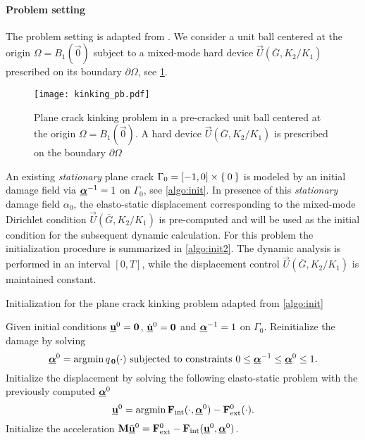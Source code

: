 \paragraph{Problem setting} The problem setting is adapted from \cite{HakimKarma:2005,HakimKarma:2009}. We consider a unit ball centered at the origin $\Omega=B_1(\vec{0})$ subject to a mixed-mode hard device $\vec{U}(\overline{G},K_2/K_1)$ prescribed on its boundary $\partial\Omega$, see \cref{fig:kinking}.
\begin{figure}[htbp]
\centering
\texttt{[image: kinking\_pb.pdf]}
\caption{Plane crack kinking problem in a pre-cracked unit ball centered at the origin $\Omega=B_1(\vec{0})$. A hard device $\vec{U}(\overline{G},K_2/K_1)$ is prescribed on the boundary $\partial\Omega$} \label{fig:kinking}
\end{figure}
An existing \emph{stationary} plane crack $\Gamma_0=[-1,0]\times\Set{0}$ is modeled by an initial damage field via $\dvec^{-1}=1$ on $\Gamma_0$, see \cref{algo:init}. In presence of this \emph{stationary} damage field $\alpha_0$, the elasto-static displacement corresponding to the mixed-mode Dirichlet condition $\vec{U}(\overline{G},K_2/K_1)$ is pre-computed and will be used as the initial condition for the subsequent dynamic calculation. For this problem the initialization procedure is summarized in \cref{algo:init2}. The dynamic analysis is performed in an interval $[0,T]$, while the displacement control $\vec{U}(\overline{G},K_2/K_1)$ is maintained constant.
\begin{algorithm}[htbp]
\caption{Initialization for the plane crack kinking problem adapted from \cref{algo:init}} \label{algo:init2}
\begin{algorithmic}[1]\linespread{1.2}\selectfont\normalsize
\State Given initial conditions $\uvec^0=\vec{0}$, $\dot{\uvec}^0=\vec{0}$ and $\dvec^{-1}=1$ on $\Gamma_0$.
\State Reinitialize the damage by solving
\[
\dvec^0=\operatorname{arg min}q_{\,\vec{0}}(\cdot)\text{ subjected to constraints $0\leq\dvec^{-1}\leq\dvec^0\leq 1$}.
\]
\State Initialize the displacement by solving the following elasto-static problem with the previously computed $\dvec^0$
\[
\uvec^0=\operatorname{arg min}\vec{F}_\mathrm{int}(\cdot,\dvec^0)-\vec{F}_\mathrm{ext}^0(\cdot).
\]
\State Initialize the acceleration $\vec{M}\ddot{\uvec}^0=\vec{F}_\mathrm{ext}^0-\vec{F}_\mathrm{int}(\uvec^0,\dvec^0)$.
\end{algorithmic}
\end{algorithm}

